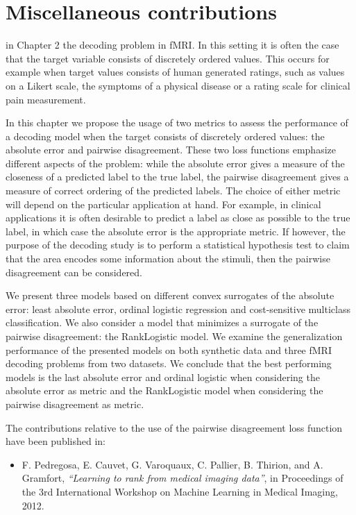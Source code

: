 \chapter{Miscellaneous contributions}\label{chap:decoding_ordinal}


\vspace*{\fill}
 in Chapter 2 the decoding problem in fMRI. In this setting it is often the case that the target variable consists of discretely ordered values. This occurs for example when target values consists of human generated ratings, such as values on a Likert scale, the symptoms of a physical disease or a rating scale for clinical pain measurement.

In this chapter we propose the usage of two metrics to assess the performance of a decoding model when the target consists of discretely ordered values: the absolute error and pairwise disagreement. These two loss functions emphasize different aspects of the problem: while the absolute error gives a measure of the closeness of a predicted label to the true label, the pairwise disagreement gives a measure of correct ordering of the predicted labels. The choice of either metric will depend on the particular application at hand. For example, in clinical applications it is often desirable to predict a label as close as possible to the true label, in which case the absolute error is the appropriate metric. If however, the purpose of the decoding study is to perform a statistical hypothesis test to claim that the area encodes some information about the stimuli, then the pairwise disagreement can be considered.


We present three models based on different convex surrogates of the absolute error: least absolute error, ordinal logistic regression and cost-sensitive multiclass classification. We also consider a model that minimizes a surrogate of the pairwise disagreement: the RankLogistic model. We examine the generalization performance of the presented models on both synthetic data and three fMRI decoding problems from two datasets. We conclude that the best performing models is the last absolute error and ordinal logistic when considering the absolute error as metric and the RankLogistic model when considering the pairwise disagreement as metric. 



\begin{shaded}
The contributions relative to the use of the pairwise disagreement loss function have been published in:
\begin{itemize}
\item F. Pedregosa, E. Cauvet, G. Varoquaux, C. Pallier, B. Thirion, and A. Gramfort, \emph{``Learning to rank from medical imaging data''}, in Proceedings of the 3rd International Workshop on Machine Learning in Medical Imaging, 2012.
\end{itemize}
\end{shaded}

